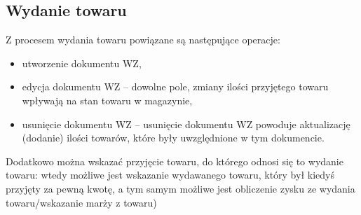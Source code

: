 \subsection{Wydanie towaru}
Z procesem wydania towaru powiązane są następujące operacje:
\begin{itemize}
	\item utworzenie dokumentu WZ,
	\item edycja dokumentu WZ -- dowolne pole, zmiany ilości przyjętego towaru wpływają na stan towaru w magazynie,
	\item usunięcie dokumentu WZ -- usunięcie dokumentu WZ powoduje aktualizację (dodanie) ilości towarów, które były uwzględnione w tym dokumencie.
\end{itemize}

Dodatkowo można wskazać przyjęcie towaru, do którego odnosi się to wydanie towaru: wtedy możliwe jest wskazanie wydawanego towaru, który był kiedyś przyjęty za pewną kwotę, a tym samym możliwe jest obliczenie zysku ze wydania towaru/wskazanie marży z towaru)

